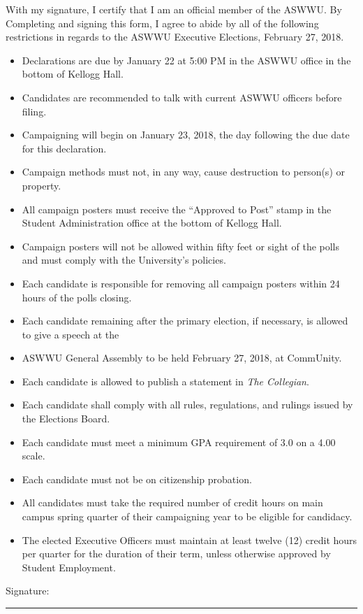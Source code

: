 With my signature, I certify that I am an official member of the ASWWU. By Completing and signing this form, I agree to abide by all of the following restrictions in regards to the ASWWU Executive Elections, February 27, 2018.
\begin{itemize}
\item Declarations are due by January 22 at 5:00 PM in the ASWWU office in the bottom of Kellogg Hall.
\item Candidates are recommended to talk with current ASWWU officers before filing.
\item Campaigning will begin on January 23, 2018, the day following the due date for this declaration.
\item Campaign methods must not, in any way, cause destruction to person(s) or property.
\item All campaign posters must receive the “Approved to Post” stamp in the Student Administration office at the bottom of Kellogg Hall.
\item Campaign posters will not be allowed within fifty feet or sight of the polls and must comply with the University’s policies.
\item Each candidate is responsible for removing all campaign posters within 24 hours of the polls closing.
\item Each candidate remaining after the primary election, if necessary, is allowed to give a speech at the
\item ASWWU General Assembly to be held February 27, 2018, at CommUnity.
\item Each candidate is allowed to publish a statement in \textit{The Collegian}.
\item Each candidate shall comply with all rules, regulations, and rulings issued by the Elections Board.
\item Each candidate must meet a minimum GPA requirement of 3.0 on a 4.00 scale.
\item Each candidate must not be on citizenship probation.
\item All candidates must take the required number of credit hours on main campus spring quarter of their campaigning year to be eligible for candidacy.
\item The elected Executive Officers must maintain at least twelve (12) credit hours per quarter for the duration of their term, unless otherwise approved by Student Employment. 
\end{itemize}

\vspace*{7mm}

Signature: \rule{7cm}{0.15mm}


